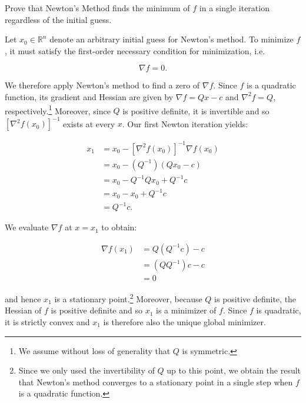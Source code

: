 Prove that Newton's Method finds the minimum of $f$ in a single iteration regardless of the initial guess.

\begin{solution}
  Let $x_0 \in \mathbb{R}^n$ denote an arbitrary initial guess for Newton's method. To minimize $f$, it must 
  satisfy the first-order necessary condition for minimization, i.e.

  $$
  \nabla f = 0.
  $$

  We therefore apply Newton's method to find a zero of $\nabla f$. Since $f$ is a quadratic function, its gradient and 
  Hessian are given by $\nabla f = Q x - c$ and $\nabla^2 f = Q$, respectively.\footnote{
    We assume without loss of generality that $Q$ is symmetric. 
  } Moreover, since $Q$ is positive definite, it is invertible and so $\left[\nabla^2 f(x_0) \right]^{-1}$ exists at 
  every $x$. Our first Newton iteration yields:

  \begin{align*}
    x_1 &= x_0 - \left[\nabla^2 f(x_0) \right]^{-1} \nabla f(x_0) \\
        &= x_0 - \left( Q^{-1} \right) \left(Q x_0 - c \right) \\
        &= x_0 - Q^{-1} Q x_0 + Q^{-1} c \\
        &= x_0 - x_0 + Q^{-1} c \\
        &= Q^{-1} c.
  \end{align*}

  We evaluate $\nabla f$ at $x = x_1$ to obtain:

  \begin{align*}
    \nabla f(x_1) &= Q \left( Q^{-1} c \right) - c \\
                  &= \left( Q  Q^{-1} \right) c - c \\
                  &= 0
  \end{align*}

  and hence $x_1$ is a stationary point.\footnote{
    Since we only used the invertibility of $Q$ up to this point, we obtain the result that Newton's method converges 
    to a stationary point in a single step when $f$ is a quadratic function.
  } Moreover, because $Q$ is positive definite, the Hessian of $f$ is positive 
  definite and so $x_1$ is a minimizer of $f$. Since $f$ is quadratic, it is strictly convex and $x_1$ is therefore
  also the unique global minimizer.
  \ \\
\end{solution}